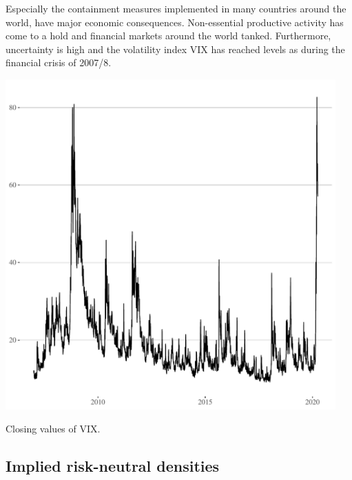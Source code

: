 \documentclass[a4paper]{tufte-handout}
\begin{document}
Especially the containment measures implemented in many countries
around the world, have major economic consequences. Non-essential
productive activity has come to a hold and financial markets around
the world tanked. Furthermore, uncertainty is high and the volatility
index VIX has reached levels as during the financial crisis of 2007/8.
\begin{marginfigure}
  \begin{center}
    \includegraphics[width=0.95\textwidth]{../figs/VIX.pdf}
  \end{center}
  \caption{Closing values of VIX.}
\end{marginfigure}

\subsection{Implied risk-neutral densities}
\end{document}
